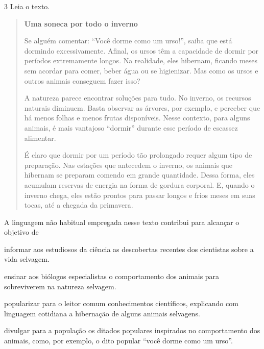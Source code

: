 \num{3} Leia o texto.

\begin{quote}
\textbf{Uma soneca por todo o inverno}

Se alguém comentar: ``Você dorme como um urso!'', saiba que está
dormindo excessivamente. Afinal, os ursos têm a capacidade de dormir por
períodos extremamente longos. Na realidade, eles hibernam, ficando meses
sem acordar para comer, beber água ou se higienizar. Mas como os ursos e
outros animais conseguem fazer isso?

A natureza parece encontrar soluções para tudo. No inverno, os recursos
naturais diminuem. Basta observar as árvores, por exemplo, e perceber
que há menos folhas e menos frutas disponíveis. Nesse contexto, para
alguns animais, é mais vantajoso ``dormir'' durante esse período de
escassez alimentar.

É claro que dormir por um período tão prolongado requer algum tipo de
preparação. Nas estações que antecedem o inverno, os animais que
hibernam se preparam comendo em grande quantidade. Dessa forma, eles
acumulam reservas de energia na forma de gordura corporal. E, quando o
inverno chega, eles estão prontos para passar longos e frios meses em
suas tocas, até a chegada da primavera.
\end{quote}


A linguagem não habitual empregada nesse texto contribui para alcançar o
objetivo de

\begin{escolha}

\item informar aos estudiosos da ciência as descobertas recentes dos
cientistas sobre a vida selvagem.

\item ensinar aos biólogos especialistas o comportamento dos animais para
sobreviverem na natureza selvagem.

\item popularizar para o leitor comum conhecimentos científicos, explicando
com linguagem cotidiana a hibernação de alguns animais selvagens.

\item divulgar para a população os ditados populares inspirados no
comportamento dos animais, como, por exemplo, o dito popular ``você
dorme como um urso''.
\end{escolha}

